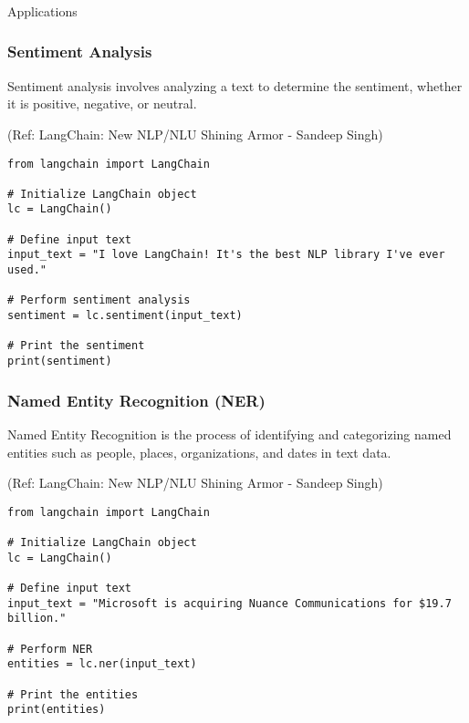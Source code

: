 \begin{frame}[fragile]\frametitle{}
\begin{center}
{\Large Applications}
\end{center}
\end{frame}




\begin{frame}[fragile]\frametitle{Sentiment Analysis}

Sentiment analysis involves analyzing a text to determine the sentiment, whether it is positive, negative, or neutral. 

{\tiny (Ref: LangChain: New NLP/NLU Shining Armor - Sandeep Singh)}

\begin{lstlisting}
from langchain import LangChain

# Initialize LangChain object
lc = LangChain()

# Define input text
input_text = "I love LangChain! It's the best NLP library I've ever used."

# Perform sentiment analysis
sentiment = lc.sentiment(input_text)

# Print the sentiment
print(sentiment)
\end{lstlisting}	  

\end{frame}


\begin{frame}[fragile]\frametitle{Named Entity Recognition (NER)}

Named Entity Recognition is the process of identifying and categorizing named entities such as people, places, organizations, and dates in text data.

{\tiny (Ref: LangChain: New NLP/NLU Shining Armor - Sandeep Singh)}

\begin{lstlisting}
from langchain import LangChain

# Initialize LangChain object
lc = LangChain()

# Define input text
input_text = "Microsoft is acquiring Nuance Communications for $19.7 billion."

# Perform NER
entities = lc.ner(input_text)

# Print the entities
print(entities)
\end{lstlisting}	  

\end{frame}

